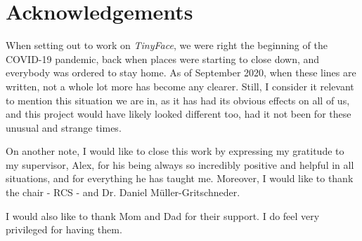 
\chapter*{Acknowledgements}
When setting out to work on \textit{TinyFace}, we were right the beginning of the COVID-19 pandemic, back when places were starting to close down, and everybody was ordered to stay home. As of September 2020, when these lines are written, not a whole lot more has become any clearer. Still, I consider it relevant to mention this situation we are in, as it has had its obvious effects on all of us, and this project would have likely looked different too, had it not been for these unusual and strange times. \par
On another note, I would like to close this work by expressing my gratitude to my supervisor, Alex, for his being always so incredibly positive and helpful in all situations, and for everything he has taught me. Moreover, I would like to thank the chair - RCS - and Dr. Daniel Müller-Gritschneder. \par
I would also like to thank Mom and Dad for their support. I do feel very privileged for having them.